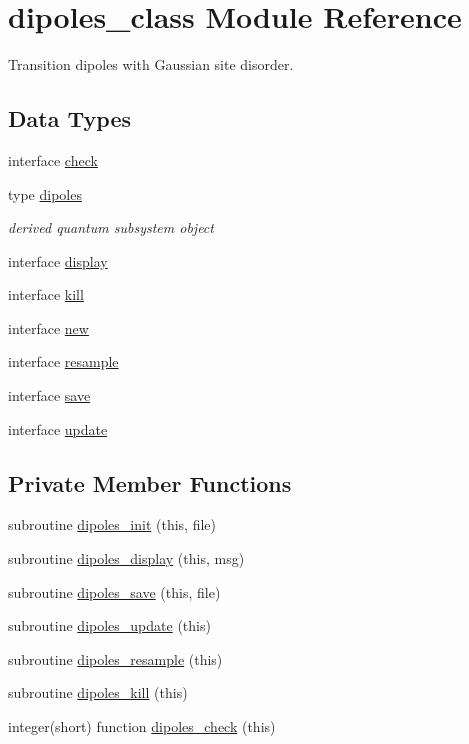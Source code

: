 \hypertarget{classdipoles__class}{\section{dipoles\+\_\+class Module Reference}
\label{classdipoles__class}
}


Transition dipoles with Gaussian site disorder.  


\subsection*{Data Types}
\begin{DoxyCompactItemize}
\item 
interface \hyperlink{interfacedipoles__class_1_1check}{check}
\item 
type \hyperlink{structdipoles__class_1_1dipoles}{dipoles}
\begin{DoxyCompactList}\small\item\em derived quantum subsystem object \end{DoxyCompactList}\item 
interface \hyperlink{interfacedipoles__class_1_1display}{display}
\item 
interface \hyperlink{interfacedipoles__class_1_1kill}{kill}
\item 
interface \hyperlink{interfacedipoles__class_1_1new}{new}
\item 
interface \hyperlink{interfacedipoles__class_1_1resample}{resample}
\item 
interface \hyperlink{interfacedipoles__class_1_1save}{save}
\item 
interface \hyperlink{interfacedipoles__class_1_1update}{update}
\end{DoxyCompactItemize}
\subsection*{Private Member Functions}
\begin{DoxyCompactItemize}
\item 
subroutine \hyperlink{classdipoles__class_a947aef5d45c6e39accc6c0e20f619c57}{dipoles\+\_\+init} (this, file)
\item 
subroutine \hyperlink{classdipoles__class_a732ca8b1573dd77731c6272ce551bc70}{dipoles\+\_\+display} (this, msg)
\item 
subroutine \hyperlink{classdipoles__class_a9ab428011961577796577f9cdeb032b4}{dipoles\+\_\+save} (this, file)
\item 
subroutine \hyperlink{classdipoles__class_a9157bf14add87f3f26edfbc88c0da6fe}{dipoles\+\_\+update} (this)
\item 
subroutine \hyperlink{classdipoles__class_a2d80cb493920a4619e0e83abfcb033f6}{dipoles\+\_\+resample} (this)
\item 
subroutine \hyperlink{classdipoles__class_ab610221599ac72fa22a02617e550033b}{dipoles\+\_\+kill} (this)
\item 
integer(short) function \hyperlink{classdipoles__class_acf34b0d8a2cae92c5b35a03eb9c0237b}{dipoles\+\_\+check} (this)
\end{DoxyCompactItemize}


